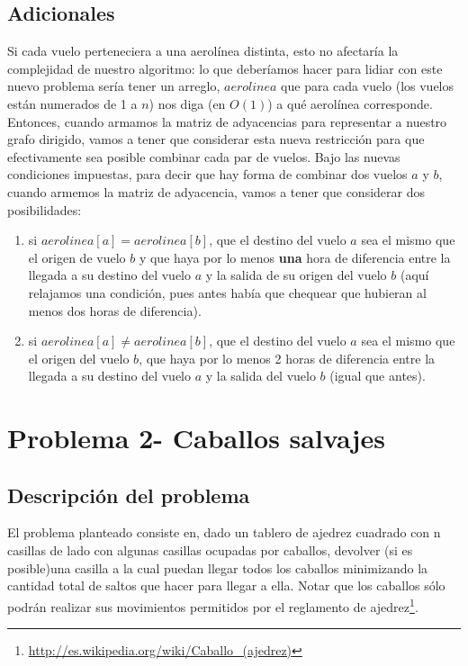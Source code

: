 \documentclass[11pt, a4paper, twoside]{article}
\begin{document}
\subsection{Adicionales}
Si cada vuelo perteneciera a una aerolínea distinta, esto no afectaría la complejidad
de nuestro algoritmo: lo que deberíamos hacer para lidiar con este nuevo problema 
sería tener un arreglo, $aerolinea$ que para cada vuelo (los vuelos están numerados de 1 a $n$) nos
diga (en $O(1)$) a qué aerolínea corresponde. Entonces, cuando armamos la matriz de 
adyacencias para representar a nuestro grafo dirigido, vamos a tener que considerar esta
nueva restricción para que efectivamente sea posible combinar cada par de vuelos. Bajo las
nuevas condiciones impuestas, para decir que hay forma de combinar dos vuelos $a$ y $b$, 
cuando armemos la matriz de adyacencia, vamos a tener que considerar dos posibilidades: 
\begin{enumerate}
	\item si $aerolinea[a] = aerolinea[b]$, que el destino del vuelo $a$ sea el mismo que 
	el origen de vuelo $b$ y que haya por lo menos \textbf{una} hora de diferencia entre la llegada 
	a su destino del vuelo $a$ y la salida de su origen del vuelo $b$ (aquí relajamos una 
	condición, pues antes había que chequear que hubieran al menos dos horas de diferencia).
	\item si $aerolinea[a] \neq aerolinea[b]$, que el destino del vuelo $a$ sea el mismo que
	el origen del vuelo $b$, que haya por lo menos 2 horas de diferencia entre la llegada a su
	destino del vuelo $a$ y la salida del vuelo $b$ (igual que antes).
\end{enumerate}



\section{Problema 2- Caballos salvajes}

\subsection{Descripción del problema}

El problema planteado consiste en, dado un tablero de ajedrez cuadrado con n casillas de lado con algunas casillas ocupadas por caballos, devolver (si es posible)una casilla a la cual puedan llegar todos los caballos minimizando la cantidad total de saltos que hacer para llegar a ella. Notar que los caballos sólo podrán realizar sus movimientos permitidos por el reglamento de ajedrez\footnote{\url{http://es.wikipedia.org/wiki/Caballo_(ajedrez)}}.
\end{document}
